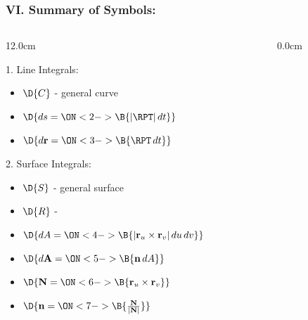 \begin{frame}
\frametitle{VI. Summary of Symbols:}
\scriptsize
\begin{columns}
\begin{column}{12.0cm}

\vspace{0.2cm}
1. Line Integrals:

\vspace{0.2cm}

\begin{itemize}
	\item $\D{C}$ - general curve
	\vspace{0.1cm}
	\item $\D{ds = 
	\ON<2->{\B{|\RPT|\, dt}}}$
	\vspace{0.1cm}
	\item $\D{d{\bf r} = 
	\ON<3->{\B{\RPT \, dt}}}$
\end{itemize}

\vspace{1.0cm}

2. Surface Integrals:

\vspace{0.2cm}

\begin{itemize}
	\item $\D{S}$ - general surface
	\vspace{0.1cm}
	\item $\D{R}$ - 
	\vspace{0.1cm}
	\item $\D{dA = 
	\ON<4->{\B{|{\bf r}_u \times {\bf r}_v| \, du \, dv}}}$
	\vspace{0.1cm}
	\item $\D{d{\bf A} = 
	\ON<5->{\B{{\bf n} \, dA}}}$
	\vspace{0.1cm}
	\item $\D{{\bf N} = 
	\ON<6->{\B{{\bf r}_u \times {\bf r}_v}}}$
	\vspace{0.1cm}
	\item $\D{{\bf n} = 
	\ON<7->{\B{\frac{{\bf N}}{|{\bf N}|}}}}$
\end{itemize}

\end{column}
\begin{column}{0.0cm}\end{column}
\end{columns}
\end{frame}
